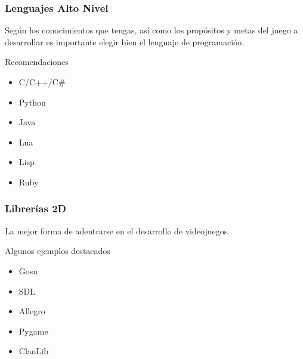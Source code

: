 
\begin{frame}
	\frametitle{Lenguajes Alto Nivel}
	
	Según los conocimientos que tengas, así como los propósitos y metas del juego a desarrollar es importante elegir bien el lenguaje de programación.
		
	\begin{block}{Recomendaciones}
		\begin{itemize}
			\item C/C++/C\#
			\item Python
			\item Java
			\item Lua
			\item Lisp
			\item Ruby
		\end{itemize}
	\end{block}

\end{frame}


\begin{frame}
	\frametitle{Librerías 2D}
		
	La mejor forma de adentrarse en el desarrollo de videojuegos.
	\newline
	\begin{block}{Algunos ejemplos destacados}
		\begin{itemize}
			\item Gosu
			\item SDL
			\item Allegro
			\item Pygame
			\item ClanLib
		\end{itemize}
	\end{block}

\end{frame}


